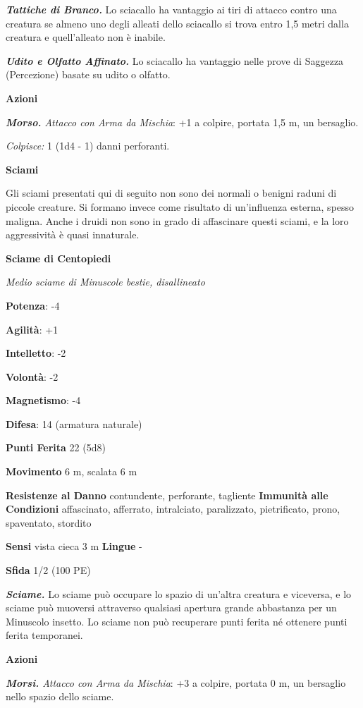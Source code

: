 \begin{multicols}{2}
\emph{\textbf{Tattiche di Branco.}} Lo sciacallo ha vantaggio ai tiri di
attacco contro una creatura se almeno uno degli alleati dello sciacallo
si trova entro 1,5 metri dalla creatura e quell'alleato non è inabile.

\emph{\textbf{Udito e Olfatto Affinato.}} Lo sciacallo ha vantaggio
nelle prove di Saggezza (Percezione) basate su udito o olfatto.

\textbf{Azioni}

\emph{\textbf{Morso.} Attacco con Arma da Mischia}: +1 a colpire,
portata 1,5 m, un bersaglio.

\emph{Colpisce:} 1 (1d4 - 1) danni perforanti.

\textbf{Sciami}

Gli sciami presentati qui di seguito non sono dei normali o benigni
raduni di piccole creature. Si formano invece come risultato di
un'influenza esterna, spesso maligna. Anche i druidi non sono in grado
di affascinare questi sciami, e la loro aggressività è quasi innaturale.

\textbf{Sciame di Centopiedi}

\emph{Medio sciame di Minuscole bestie, disallineato}

\textbf{Potenza}: -4

\textbf{Agilità}: +1

\textbf{Intelletto}: -2

\textbf{Volontà}: -2

\textbf{Magnetismo}: -4

\textbf{Difesa}: 14 (armatura naturale)

\textbf{Punti Ferita} 22 (5d8)

\textbf{Movimento} 6 m, scalata 6 m

\textbf{Resistenze al Danno} contundente, perforante, tagliente
\textbf{Immunità alle Condizioni} affascinato, afferrato, intralciato,
paralizzato, pietrificato, prono, spaventato, stordito

\textbf{Sensi} vista cieca 3 m \textbf{Lingue} -

\textbf{Sfida} 1/2 (100 PE)

\emph{\textbf{Sciame.}} Lo sciame può occupare lo spazio di un'altra
creatura e viceversa, e lo sciame può muoversi attraverso qualsiasi
apertura grande abbastanza per un Minuscolo insetto. Lo sciame non può
recuperare punti ferita né ottenere punti ferita temporanei.

\textbf{Azioni}

\emph{\textbf{Morsi.} Attacco con Arma da Mischia}: +3 a colpire,
portata 0 m, un bersaglio nello spazio dello sciame.


\end{multicols}
